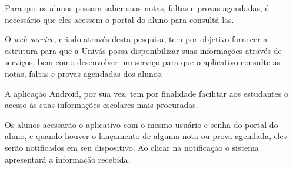 
	\par Para que os alunos possam saber suas notas, faltas e provas agendadas,
é necessário que eles acessem o portal do aluno para consultá-las.

	\par O \textit{web service}, criado através desta pesquisa, tem por objetivo
fornecer a estrutura para que a Univás possa disponibilizar suas informações
através de serviços, bem como desenvolver um serviço para que o aplicativo
consulte as notas, faltas e provas agendadas dos alunos.

	\par A aplicação Android, por sua vez, tem por finalidade facilitar aos
estudantes o acesso às suas informações escolares mais procuradas.
	
	\par Os alunos acessarão o aplicativo com o mesmo usuário e senha do
portal do aluno, e quando houver o lançamento de alguma nota ou prova agendada,
eles serão notificados em seu dispositivo. Ao clicar na notificação
o sistema apresentará a informação recebida. 